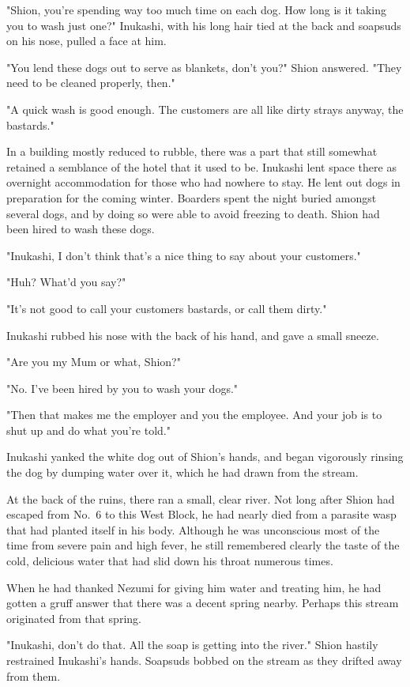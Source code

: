 "Shion, you're spending way too much time on each dog. How long is it
taking you to wash just one?" Inukashi, with his long hair tied at the
back and soapsuds on his nose, pulled a face at him.

"You lend these dogs out to serve as blankets, don't you?" Shion
answered. "They need to be cleaned properly, then."

"A quick wash is good enough. The customers are all like dirty strays
anyway, the bastards."

In a building mostly reduced to rubble, there was a part that still
somewhat retained a semblance of the hotel that it used to be. Inukashi
lent space there as overnight accommodation for those who had nowhere to
stay. He lent out dogs in preparation for the coming winter. Boarders
spent the night buried amongst several dogs, and by doing so were able
to avoid freezing to death. Shion had been hired to wash these dogs.

"Inukashi, I don't think that's a nice thing to say about your
customers."

"Huh? What'd you say?"

"It's not good to call your customers bastards, or call them dirty."

Inukashi rubbed his nose with the back of his hand, and gave a small
sneeze.

"Are you my Mum or what, Shion?"

"No. I've been hired by you to wash your dogs."

"Then that makes me the employer and you the employee. And your job is
to shut up and do what you're told."

Inukashi yanked the white dog out of Shion's hands, and began vigorously
rinsing the dog by dumping water over it, which he had drawn from the
stream.

At the back of the ruins, there ran a small, clear river. Not long after
Shion had escaped from No.~6 to this West Block, he had nearly died from
a parasite wasp that had planted itself in his body. Although he was
unconscious most of the time from severe pain and high fever, he still
remembered clearly the taste of the cold, delicious water that had slid
down his throat numerous times.

When he had thanked Nezumi for giving him water and treating him, he had
gotten a gruff answer that there was a decent spring nearby. Perhaps
this stream originated from that spring.

"Inukashi, don't do that. All the soap is getting into the river." Shion
hastily restrained Inukashi's hands. Soapsuds bobbed on the stream as
they drifted away from them.

